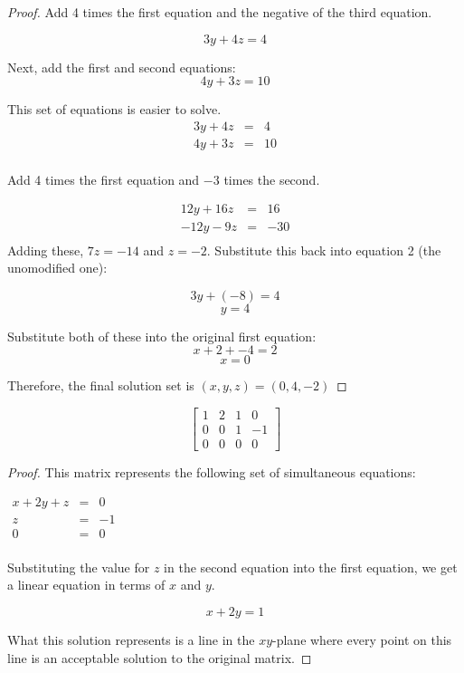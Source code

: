 \documentclass[8pt]{article}
\newenvironment{problem}[2][Problem]{\begin{trivlist}
\item[\hskip \labelsep {\bfseries #1}\hskip \labelsep {\bfseries #2.}]}{\end{trivlist}}
\begin{document}
\begin{proof}
Add 4 times the first equation and the negative of the third equation. 

\[3y+4z = 4\]

Next, add the first and second equations:
\[4y+3z = 10\]

This set of equations is easier to solve. 
	\[
	\begin{array}
	{lcr} 3y+4z & = & 4 \\ 
	4y+3z & = & 10 \\
	\end{array}
	\]

Add 4 times the first equation and $-3$ times the second. 

	\[
	\begin{array}
	{lcr} 12y+16z & = & 16 \\ 
	-12y-9z & = & -30 \\
	\end{array}
	\]
Adding these, $7z=-14$ and $\boxed{z = -2}$. Substitute this back into equation 2 (the unomodified one):

\[3y+(-8) = 4\]
\[\boxed{y = 4}\]

Substitute both of these into the original first equation:
\[x+2+-4 = 2\]
\[\boxed{x = 0}\]

Therefore, the final solution set is $\boxed{(x,y,z) = (0,4,-2)}$

\end{proof}


\begin{problem}{1.2.14}
\[\begin{bmatrix}

1 & 2 & 1  &  0 \\
0 & 0 & 1 & -1 \\
0 & 0 & 0 & 0
\end{bmatrix}
\]
\end{problem}

\begin{proof}
This matrix represents the following set of simultaneous equations:

	$	
	\begin{array}
	{lcr} 
	x+2y+z& = & 0 \\ 
	z & = & -1 \\
	0 & = & 0 \\
	\end{array}
	$
	
Substituting the value for $z$ in the second equation into the first equation, we get a linear equation in terms of $x$ and $y$. 

\[\boxed{x+2y = 1}\]

What this solution represents is a line in the $xy$-plane where every point on this line is an acceptable solution to the original matrix.  

\end{proof}
\end{document}
